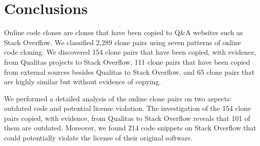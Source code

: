 \documentclass[10pt,journal,compsoc]{IEEEtran}
\begin{document}
%

\section{Conclusions}

Online code clones are clones that have been copied to Q\&A websites
such as Stack Overflow. 
We classified 2,289 clone pairs using seven patterns of online code
cloning. We discovered 154 clone pairs that have been
copied, with evidence, from Qualitas projects to Stack Overflow, 111
clone pairs that have been copied from external sources besides
Qualitas to Stack Overflow, and 65 clone pairs that are highly
similar but without evidence of copying.

We performed a detailed analysis of the online clone pairs on two
aspects: outdated code and potential license violation. The investigation of
the 154 clone pairs copied, with evidence, from Qualitas to Stack
Overflow reveals that 101 of them are outdated.  Moreover, we found 214
code snippets on Stack Overflow that could potentially violate the license of their
original software.
\end{document}

